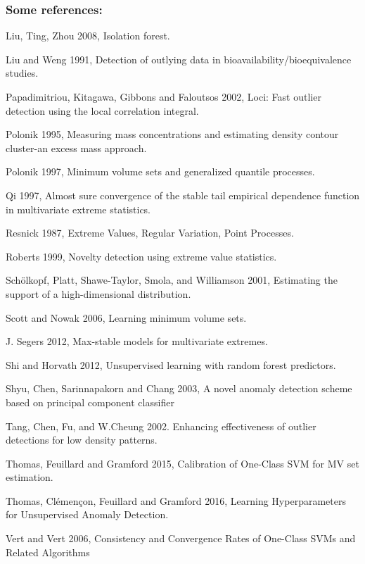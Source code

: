 \documentclass[9pt]{beamer}
\begin{document}
\begin{frame}
\frametitle{Some references:}
\begin{itemize}
\footnotesize{

\item Liu, Ting, Zhou 2008, Isolation forest.

\item Liu and Weng 1991,  Detection of outlying data in bioavailability/bioequivalence studies. 

\item Papadimitriou, Kitagawa, Gibbons and Faloutsos 2002, Loci: Fast outlier detection using the local correlation integral.

\item Polonik 1995, Measuring mass concentrations and estimating density contour cluster-an excess mass approach.

\item Polonik 1997, Minimum volume sets and generalized quantile processes.

\item Qi 1997, Almost sure convergence of the stable tail empirical dependence function in multivariate extreme statistics.

\item Resnick 1987, Extreme Values, Regular Variation, Point Processes.

\item Roberts 1999, Novelty detection using extreme value statistics.

\item Sch{\"o}lkopf, Platt, Shawe-Taylor, Smola, and Williamson 2001, Estimating the support of a high-dimensional distribution.

\item Scott and Nowak 2006, Learning minimum volume sets.

\item J. Segers 2012, Max-stable models for multivariate extremes.

\item Shi and Horvath 2012, Unsupervised learning with random forest predictors.

\item Shyu, Chen, Sarinnapakorn and Chang 2003, A novel anomaly detection scheme based on principal component classifier

\item Tang, Chen, Fu, and W.Cheung 2002. Enhancing effectiveness of outlier detections for low density patterns.

\item Thomas, Feuillard and Gramford 2015, Calibration of One-Class SVM for MV set estimation.

\item Thomas, Clémençon, Feuillard and Gramford 2016, Learning Hyperparameters for Unsupervised Anomaly Detection.

\item Vert and Vert 2006, Consistency and Convergence Rates of One-Class SVMs and Related Algorithms
}
\end{itemize}
\end{frame}
\end{document}
